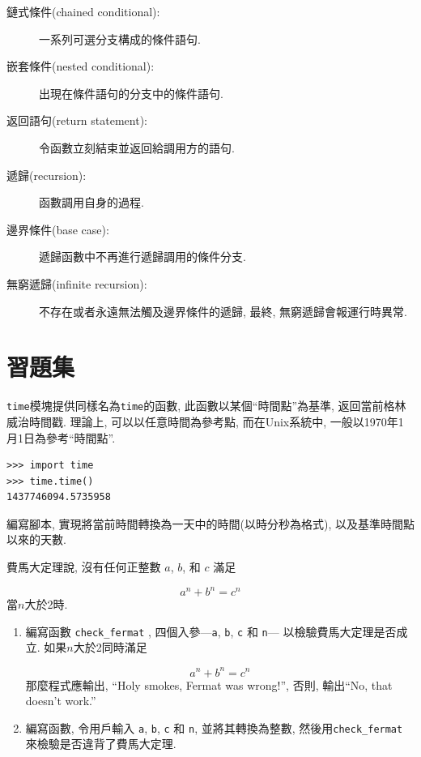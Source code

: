 \documentclass[10pt]{book}
\begin{document}
\begin{description}
\item[鏈式條件(chained conditional):] 一系列可選分支構成的條件語句. 

\item[嵌套條件(nested conditional):]  出現在條件語句的分支中的條件語句. 

\item[返回語句(return statement):] 令函數立刻結束並返回給調用方的語句. 

\item[遞歸(recursion):]  函數調用自身的過程. 

\item[邊界條件(base case):]  遞歸函數中不再進行遞歸調用的條件分支. 

\item[無窮遞歸(infinite recursion):]  不存在或者永遠無法觸及邊界條件的遞歸, 最終, 無窮遞歸會報運行時異常.

\end{description}

\section{習題集}

\begin{exercise}

{\tt time}模塊提供同樣名為{\tt time}的函數, 此函數以某個``時間點''為基準, 
返回當前格林威治時間戳. 理論上, 可以以任意時間為參考點, 而在Unix系統中, 
一般以1970年1月1日為參考``時間點''. 

\begin{verbatim}
>>> import time
>>> time.time()
1437746094.5735958
\end{verbatim}

編寫腳本, 實現將當前時間轉換為一天中的時間(以時分秒為格式), 
以及基準時間點以來的天數. 

\end{exercise}


\begin{exercise}

費馬大定理說, 沒有任何正整數
$a$, $b$, 和 $c$ 滿足

\[ a^n + b^n = c^n \]
%
當$n$大於2時.

\begin{enumerate}

\item 編寫函數 \verb"check_fermat" , 四個入參---{\tt a}, {\tt b}, {\tt c} 和 {\tt n}---
以檢驗費馬大定理是否成立. 
如果$n$大於2同時滿足

\[a^n + b^n = c^n \]
%
那麼程式應輸出,  ``Holy smokes, Fermat was wrong!'', 
否則, 輸出``No, that doesn't work.''

\item 編寫函數, 令用戶輸入 {\tt a}, {\tt b}, {\tt c} 和 {\tt n}, 
並將其轉換為整數, 然後用\verb"check_fermat" 來檢驗是否違背了費馬大定理. 

\end{enumerate}

\end{exercise}
\end{document}
